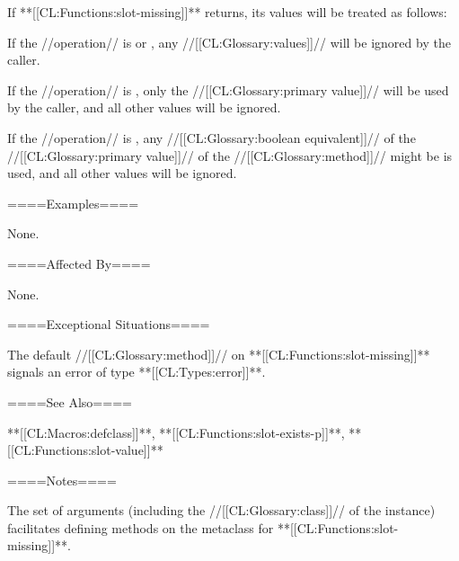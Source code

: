If **[[CL:Functions:slot-missing]]** returns, its values will be treated as follows:

\beginlist \item{\bull} If the //operation// is  or , any //[[CL:Glossary:values]]// will be ignored by the caller.

\item{\bull} If the //operation// is , only the //[[CL:Glossary:primary value]]// will be used by the caller, and all other values will be ignored.

\item{\bull} If the //operation// is , any //[[CL:Glossary:boolean equivalent]]// of the //[[CL:Glossary:primary value]]// of the //[[CL:Glossary:method]]// might be is used, and all other values will be ignored. \endlist

====Examples====

None.

====Affected By====

None.

====Exceptional Situations====

The default //[[CL:Glossary:method]]// on **[[CL:Functions:slot-missing]]** signals an error of type **[[CL:Types:error]]**.

====See Also====

**[[CL:Macros:defclass]]**, **[[CL:Functions:slot-exists-p]]**, **[[CL:Functions:slot-value]]**

====Notes====

The set of arguments (including the //[[CL:Glossary:class]]// of the instance) facilitates defining methods on the metaclass for **[[CL:Functions:slot-missing]]**.

